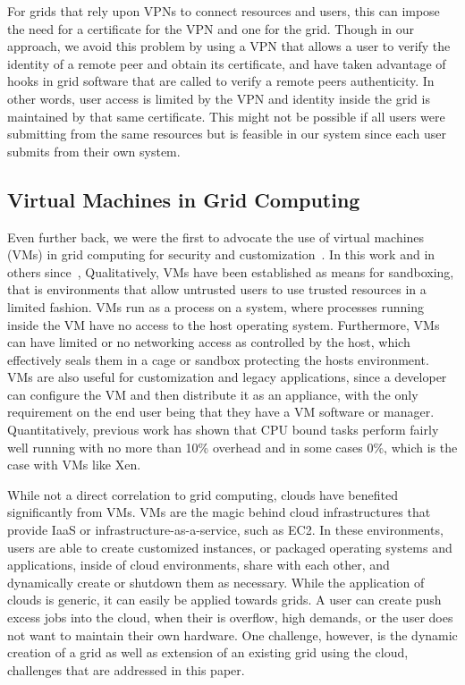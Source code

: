 \documentclass[conference]{IEEEtran}
\begin{document}
For grids that rely upon VPNs to connect resources and users, this can impose
the need for a certificate for the VPN and one for the grid.  Though in our
approach, we avoid this problem by using a VPN that allows a user to verify the
identity of a remote peer and obtain its certificate, and have taken advantage
of hooks in grid software that are called to verify a remote peers
authenticity.  In other words, user access is limited by the VPN and identity
inside the grid is maintained by that same certificate.  This might not be
possible if all users were submitting from the same resources but is feasible
in our system since each user submits from their own system.

\subsection{Virtual Machines in Grid Computing}

Even further back, we were the first to advocate the use of virtual machines
(VMs) in grid computing for security and customization~\cite{fig_grid}.  In
this work and in others since~\cite{sandbox, dve, ourgrid_paper},
Qualitatively, VMs have been established as means for sandboxing, that is
environments that allow untrusted users to use trusted resources in a limited
fashion.  VMs run as a process on a system, where processes running inside the
VM have no access to the host operating system.  Furthermore, VMs can have
limited or no networking access as controlled by the host, which effectively
seals them in a cage or sandbox protecting the hosts environment.  VMs are also
useful for customization and legacy applications, since a developer can
configure the VM and then distribute it as an appliance, with the only
requirement on the end user being that they have a VM software or manager.
Quantitatively, previous work has shown that CPU bound tasks perform fairly
well running with no more than 10\% overhead and in some cases 0\%, which is
the case with VMs like Xen.

While not a direct correlation to grid computing, clouds have benefited
significantly from VMs.  VMs are the magic behind cloud infrastructures that
provide IaaS or infrastructure-as-a-service, such as EC2.  In these
environments, users are able to create customized instances, or packaged
operating systems and applications, inside of cloud environments, share with
each other, and dynamically create or shutdown them as necessary.  While the
application of clouds is generic, it can easily be applied towards grids.  A
user can create push excess jobs into the cloud, when their is overflow, high
demands, or the user does not want to maintain their own hardware.  One
challenge, however, is the dynamic creation of a grid as well as extension of
an existing grid using the cloud, challenges that are addressed in this paper.
\end{document}
